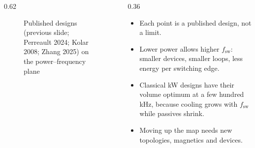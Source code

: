 \begin{frame}
\begin{columns}[T]
\begin{column}{0.62\textwidth}
\begin{figure}
				\caption{Published designs (previous slide; Perreault 2024; Kolar 2008; Zhang 2025) on the power--frequency plane}
			\end{figure}
		\end{column}
		\begin{column}{0.36\textwidth}
			\small
			\begin{itemize}
				\item Each point is a published design, not a limit.
				\item Lower power allows higher $f_\mathrm{sw}$: smaller devices, smaller loops, less energy per switching edge.
				\item Classical kW designs have their volume optimum at a few hundred kHz, because cooling grows with $f_\mathrm{sw}$ while passives shrink.
				\item Moving up the map needs new topologies, magnetics and devices.
			\end{itemize}
		\end{column}
	\end{columns}
\end{frame}


